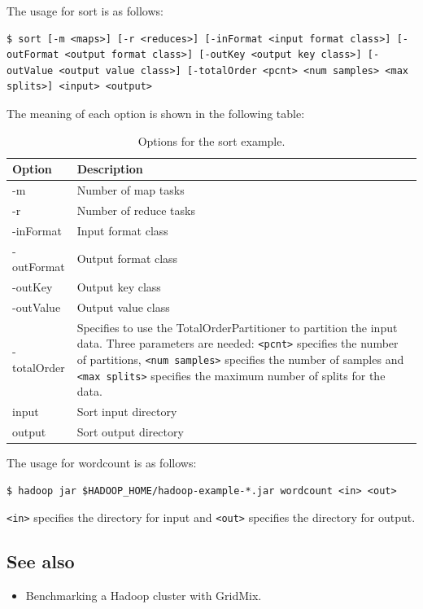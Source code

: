 The usage for sort is as follows: 
\lstset{style=bashstyle}
\begin{lstlisting}
$ sort [-m <maps>] [-r <reduces>] [-inFormat <input format class>] [-outFormat <output format class>] [-outKey <output key class>] [-outValue <output value class>] [-totalOrder <pcnt> <num samples> <max splits>] <input> <output>
\end{lstlisting}

The meaning of each option is shown in the following table: \\
\begin{table}[h]
  \centering
  \begin{tabular}{ll}
    \toprule
    \textbf{Option} & \textbf{Description} \\ \midrule
      -m & Number of map tasks \\
      -r & Number of reduce tasks \\
      -inFormat & Input format class \\
      -outFormat & Output format class \\
      -outKey & Output key class \\
      -outValue & Output value class \\
      -totalOrder & \begin{minipage}[t]{0.8\textwidth}Specifies to use the TotalOrderPartitioner to partition the input data. Three parameters are needed: \verb|<pcnt>| specifies the number of partitions, \verb|<num samples>| specifies the number of samples and \verb|<max splits>| specifies the maximum number of splits for the data.\end{minipage} \\
      input & Sort input directory \\
      output & Sort output directory \\ \bottomrule
    \end{tabular}
    \caption{Options for the sort example.}\label{tbl:sort}
  \end{table}

The usage for wordcount is as follows:
\lstset{style=bashstyle}
\begin{lstlisting}
$ hadoop jar $HADOOP_HOME/hadoop-example-*.jar wordcount <in> <out>
\end{lstlisting}
\verb|<in>| specifies the directory for input and \verb|<out>| specifies the directory for output.

\subsection*{See also}
\begin{itemize}
  \item Benchmarking a Hadoop cluster with GridMix.
\end{itemize}
